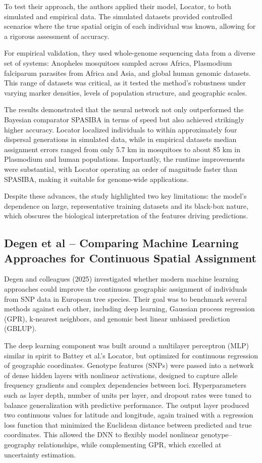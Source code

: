 To test their approach, the authors applied their model, Locator, to both simulated and empirical data. The simulated datasets provided controlled scenarios where the true spatial origin of each individual was known, allowing for a rigorous assessment of accuracy.

For empirical validation, they used whole-genome sequencing data from a diverse set of systems: Anopheles mosquitoes sampled across Africa, Plasmodium falciparum parasites from Africa and Asia, and global human genomic datasets. This range of datasets was critical, as it tested the method's robustness under varying marker densities, levels of population structure, and geographic scales.

The results demonstrated that the neural network not only outperformed the Bayesian comparator SPASIBA in terms of speed but also achieved strikingly higher accuracy. Locator localized individuals to within approximately four dispersal generations in simulated data, while in empirical datasets median assignment errors ranged from only 5.7 km in mosquitoes to about 85 km in Plasmodium and human populations. Importantly, the runtime improvements were substantial, with Locator operating an order of magnitude faster than SPASIBA, making it suitable for genome-wide applications.

Despite these advances, the study highlighted two key limitations: the model's dependence on large, representative training datasets and its black-box nature, which obscures the biological interpretation of the features driving predictions.

\subsection{Degen et al – Comparing Machine Learning Approaches for Continuous Spatial Assignment}

Degen and colleagues (2025) \cite{degen2025machine} investigated whether modern machine learning approaches could improve the continuous geographic assignment of individuals from SNP data in European tree species. Their goal was to benchmark several methods against each other, including deep learning, Gaussian process regression (GPR), k-nearest neighbors, and genomic best linear unbiased prediction (GBLUP).

The deep learning component was built around a multilayer perceptron (MLP) similar in spirit to Battey et al.'s Locator, but optimized for continuous regression of geographic coordinates. Genotype features (SNPs) were passed into a network of dense hidden layers with nonlinear activations, designed to capture allele frequency gradients and complex dependencies between loci. Hyperparameters such as layer depth, number of units per layer, and dropout rates were tuned to balance generalization with predictive performance. The output layer produced two continuous values for latitude and longitude, again trained with a regression loss function that minimized the Euclidean distance between predicted and true coordinates. This allowed the DNN to flexibly model nonlinear genotype–geography relationships, while complementing GPR, which excelled at uncertainty estimation.

